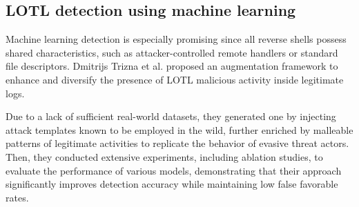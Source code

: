 
\subsection*{LOTL detection using machine learning}

Machine learning detection is especially promising since all reverse shells possess shared characteristics, such as attacker-controlled remote handlers or standard file descriptors. Dmitrijs Trizna et al. proposed an augmentation framework \cite{LOTL} to enhance and diversify the presence of LOTL malicious activity inside legitimate logs.

Due to a lack of sufficient real-world datasets, they generated one by injecting attack templates known to be employed in the wild, further enriched by malleable patterns of legitimate activities to replicate the behavior of evasive threat actors. Then, they conducted extensive experiments, including ablation studies, to evaluate the performance of various models, demonstrating that their approach significantly improves detection accuracy while maintaining low false favorable rates.
